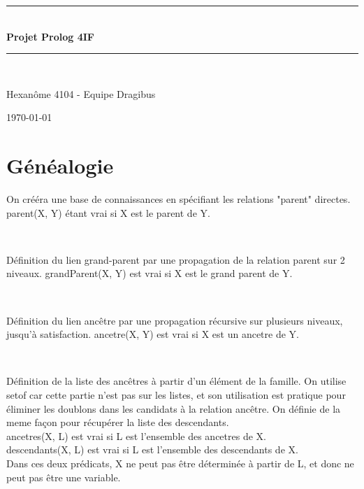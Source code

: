 \documentclass[a4paper, 11pt]{article}
\newcommand{\HRule}{\rule{\linewidth}{0.5mm}}
\newenvironment{DDbox}[1]{
\begin{lrbox}{\BBbox}\begin{minipage}{\linewidth}}
{\end{minipage}\end{lrbox}\noindent\colorbox{Zgris}{\usebox{\BBbox}} \\
[.5cm]}
\begin{document}
\begin{titlepage}
    \begin{center}
        \HRule \\[0.4cm]
        {\huge \bfseries Projet Prolog 4IF}
        \HRule \\[1.5cm]

        \begin{minipage}{0.8\textwidth}
            \center
            \large
            Hexanôme 4104 - Equipe Dragibus
        \end{minipage}

        \vfill
        {\large \today}
    \end{center}
\end{titlepage}

\tableofcontents
\newpage

\section{Généalogie}
On crééra une base de connaissances en spécifiant les relations "parent"
directes. parent(X, Y) étant vrai si X est le parent de Y. \\
\begin{DDbox}{\linewidth}
    
\end{DDbox}

Définition du lien grand-parent par une propagation de la relation parent sur 2
niveaux. grandParent(X, Y) est vrai si X est le grand parent de Y. \\
\begin{DDbox}{\linewidth}
    
\end{DDbox}

Définition du lien ancêtre par une propagation récursive sur plusieurs
niveaux, jusqu'à satisfaction. ancetre(X, Y) est vrai si X est un ancetre de Y. \\
\begin{DDbox}{\linewidth}
    
\end{DDbox}

Définition de la liste des ancêtres à partir d'un élément de la
famille.  On utilise setof car cette partie n'est pas sur les
listes, et son utilisation est pratique pour éliminer les
doublons dans les candidats à la relation ancêtre. On définie de
la meme façon pour récupérer la liste des descendants. \\
ancetres(X, L) est vrai si L est l'ensemble des ancetres de X. \\
descendants(X, L) est vrai si L est l'ensemble des descendants de X. \\
Dans ces deux prédicats, X ne peut pas être déterminée à partir
de L, et donc ne peut pas être une variable. \\
\begin{DDbox}{\linewidth}
    
\end{DDbox}
\end{document}
